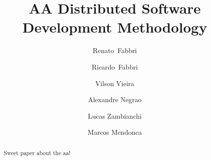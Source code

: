 \title{%
AA Distributed Software Development Methodology
}

\author{%
Renato~Fabbri \and Ricardo~Fabbri \and Vilson Vieira \and Alexandre Negrao \and Lucas Zambianchi
\and Marcos Mendonca
}

\maketitle


\begin{abstract}
Sweet paper about the aa!
\end{abstract}

